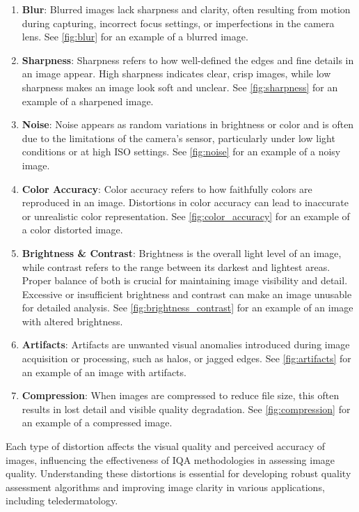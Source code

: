 \begin{enumerate}
    \item \textbf{Blur}: Blurred images lack sharpness and clarity, often resulting from motion during capturing, incorrect focus settings, or imperfections in the camera lens. See \autoref{fig:blur} for an example of a blurred image.
    \item \textbf{Sharpness}: Sharpness refers to how well-defined the edges and fine details in an image appear. High sharpness indicates clear, crisp images, while low sharpness makes an image look soft and unclear. See \autoref{fig:sharpness} for an example of a sharpened image.
    \item \textbf{Noise}: Noise appears as random variations in brightness or color and is often due to the limitations of the camera’s sensor, particularly under low light conditions or at high ISO settings. See \autoref{fig:noise} for an example of a noisy image.
    \item \textbf{Color Accuracy}:  Color accuracy refers to how faithfully colors are reproduced in an image. Distortions in color accuracy can lead to inaccurate or unrealistic color representation. See \autoref{fig:color_accuracy} for an example of a color distorted image.
    \item \textbf{Brightness \& Contrast}: Brightness is the overall light level of an image, while contrast refers to the range between its darkest and lightest areas. Proper balance of both is crucial for maintaining image visibility and detail. Excessive or insufficient brightness and contrast can make an image unusable for detailed analysis. See \autoref{fig:brightness_contrast} for an example of an image with altered brightness.
    \item \textbf{Artifacts}: Artifacts are unwanted visual anomalies introduced during image acquisition or processing, such as halos, or jagged edges. See \autoref{fig:artifacts} for an example of an image with artifacts.
    \item \textbf{Compression}: When images are compressed to reduce file size, this often results in lost detail and visible quality degradation. See \autoref{fig:compression} for an example of a compressed image.
\end{enumerate}
Each type of distortion affects the visual quality and perceived accuracy of images, influencing the effectiveness of IQA methodologies in assessing image quality. Understanding these distortions is essential for developing robust quality assessment algorithms and improving image clarity in various applications, including teledermatology. \par

